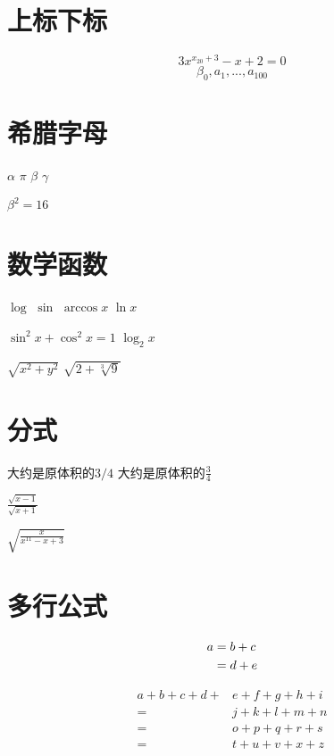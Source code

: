 \documentclass{article}
\begin{document}
\section{上标下标}
    $$3x^{x_{20} + 3} - x + 2 = 0$$
    $$\beta_0,a_1,...,a_{100}$$

\section{希腊字母} 
    $\alpha$
    $\pi$
    $\beta$
    $\gamma$

    $\beta^2 = 16$

\section{数学函数}
    $\log$
    $\sin$
    $\arccos x$
    $\ln x$

    $\sin^2 x+\cos^2 x = 1$
    $\log_2 x$

    $\sqrt{x ^ 2 + y ^ 2}$
    $\sqrt{2 + \sqrt[3]{9}}$ %

\section{分式}
    大约是原体积的$3/4$
    大约是原体积的$\frac{3}{4}$

    $\frac{\sqrt{x-1}}{\sqrt{x+1}}$

    $\sqrt{\frac{x}{x^{11} - x + 3}}$



\section{多行公式}
    \begin{align} 
    a & = b + c \notag \\ 
    &=d+e 
    \end{align}
    
    \[
    \begin{aligned} 
    a+b+c+d+& e+f+g+h+i \\
    =& j+k+l+m+n \\
    =& o+p+q+r+s \\ 
    =& t+u+v+x+z \end{aligned}
    \]
\end{document}
